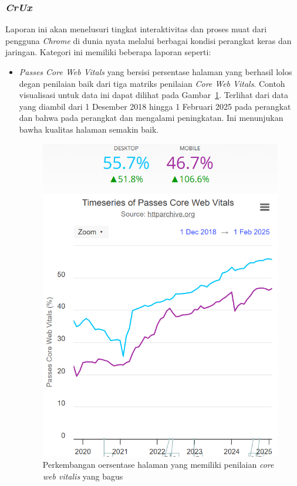 \subsubsection{\textit{CrUx}}
\label{subsub:crux}

Laporan ini akan menelusuri tingkat interaktivitas dan proses muat dari pengguna \textit{Chrome} di dunia nyata melalui berbagai kondisi perangkat keras dan jaringan. Kategori ini memiliki beberapa laporan seperti:
\begin{itemize}
    \item \textit{Passes Core Web Vitals} yang bersisi persentase halaman \web yang berhasil lolos degan penilaian baik dari tiga matriks penilaian \textit{Core Web Vitals}. Contoh visualisasi untuk data ini dapat dilihat pada Gambar~\ref{fig:cwvpass}. Terlihat dari data yang diambil dari 1 Desember 2018 hingga 1 Februari 2025 pada perangkat \desktop dan \mobile bahwa pada perangkat \desktop dan \mobile mengalami peningkatan. Ini menunjukan bawha kualitas halaman \web semakin baik.
    \begin{figure}[H]
        \centering
        \includegraphics[width=0.4\linewidth]{Gambar/Contoh Core Web Pass.png}
        \caption{Perkembangan oersentase halaman \web yang memiliki penilaian \textit{core web vitalis} yang bagus}
        \label{fig:cwvpass}
    \end{figure}


\end{itemize}
